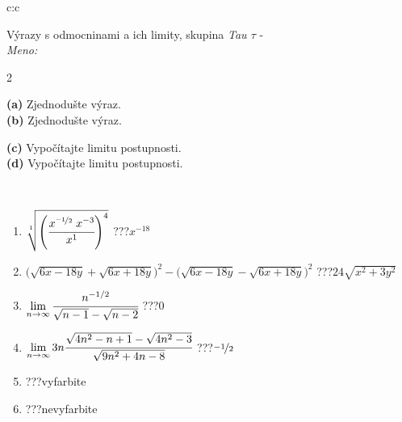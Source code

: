 \documentclass[10pt]{report}
\begin{document}
\begin{tabular}{c:c}
\begin{minipage}[c][104.5mm][t]{0.5\linewidth}
\begin{center}
\vspace{7mm}
{\huge {\Large Výrazy s odmocninami a ich limity}, skupina \textit{Tau $\tau$} -}\\[5mm]
\textit{Meno:}\phantom{xxxxxxxxxxxxxxxxxxxxxxxxxxxxxxxxxxxxxxxxxxxxxxxxxxxxxxxxxxxxxxxxx}\\[5mm]
\begin{minipage}{0.95\linewidth}
\begin{center}
{\small \begin{multicols}{2} \raggedright
\phantom{xxxxxxxxx}\textbf{(a)} Zjednodušte výraz. \\[1mm]
\phantom{xxxxxxxxx}\textbf{(b)} Zjednodušte výraz. \par \columnbreak
\textbf{(c)} Vypočítajte limitu postupnosti. \\[1mm]
\textbf{(d)} Vypočítajte limitu postupnosti.
\end{multicols}
}
\end{center}
\end{minipage}
\\[4mm]
\begin{minipage}{0.79\linewidth}
\begin{center}
\begin{varwidth}{\linewidth}
\begin{enumerate}
\small
\item $\sqrt[1]{\left(\cfrac{x^{\nicefrac{-1}{2}}\;x^{-3}}{x^{1}}\right)^{4}}$\quad \dotfill\; ???\;\dotfill \quad $x^{-18}$
\item {\footnotesize{\scriptsize$\big(\sqrt{6x-18y}+\sqrt{6x+18y}\big)^2-\big(\sqrt{6x-18y}-\sqrt{6x+18y}\big)^2$}\quad \dotfill\; ???\;\dotfill \quad $24\sqrt{x^2+3y^2}$}
\item $\lim\limits_{n\to\infty}\cfrac{n^{-1/2}}{\sqrt{n-1}-\sqrt{n-2}}$\quad \dotfill\; ???\;\dotfill \quad $0$
\item $\lim\limits_{n\to\infty}3n\cfrac{\sqrt{4n^2-n+1}-\sqrt{4n^2-3}}{\sqrt{9n^2+4n-8}}$\quad \dotfill\; ???\;\dotfill \quad $\nicefrac{-1}{2}$
\item \quad \dotfill\; ???\;\dotfill \quad vyfarbite
\item \quad \dotfill\; ???\;\dotfill \quad nevyfarbite
\end{enumerate}
\end{varwidth}
\end{center}

\end{minipage}
\end{center}
\end{minipage}
\end{tabular}
\end{document}
